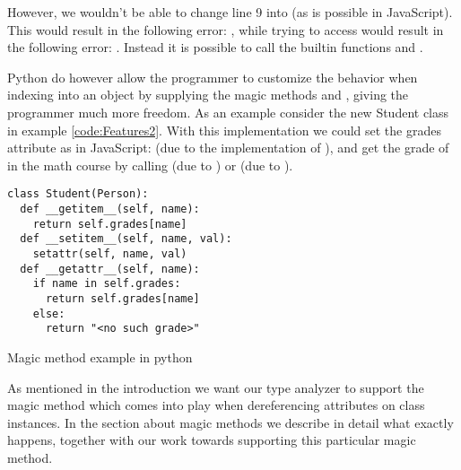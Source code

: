
However, we wouldn't be able to change line 9 into  (as is possible in JavaScript). This would result in the following error: 
, while trying to access  would result in the following error: 
. Instead it is possible to call the builtin functions 
 and .

Python do however allow the programmer to customize the behavior when indexing into an object by supplying the magic methods
 and , giving the programmer much more freedom. 
As an example consider the new Student class in example \ref{code:Features2}. 
With this implementation we could set the grades attribute as in JavaScript:  (due to the implementation of ), 
and get the grade of  in the math course by calling  (due to ) or  (due to ).

\begin{listing}[H]
\begin{verbatim}
class Student(Person):
  def __getitem__(self, name):
    return self.grades[name]
  def __setitem__(self, name, val):
    setattr(self, name, val)
  def __getattr__(self, name):
    if name in self.grades:
      return self.grades[name]
    else:
      return "<no such grade>"
\end{verbatim}
	\caption{Magic method example in python}
	\label{code:Features2}
\end{listing}

As mentioned in the introduction we want our type analyzer to support the magic method  which comes into play when dereferencing attributes on class instances. In the section about magic methods we describe in detail what exactly happens, together with our work towards supporting this particular magic method.
